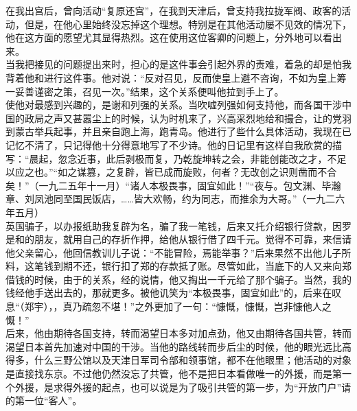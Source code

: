 在我出宫后，曾向活动“复原还宫”，在我到天津后，曾支持我拉拢军阀、政客的活动，但是，在他心里始终没忘掉这个理想。特别是在其他活动屡不见效的情况下，他在这方面的愿望尤其显得热烈。这在使用这位客卿的问题上，分外地可以看出来。\\

当我把接见的问题提出来时，担心的是这件事会引起外界的责难，着急的却是怕我背着他和进行这件事。他对说：“反对召见，反而使皇上避不咨询，不如为皇上筹一妥善谨密之策，召见一次。”结果，这个关系便叫他拉到手上了。\\

使他对最感到兴趣的，是谢和列强的关系。当吹嘘列强如何支持他，而各国干涉中国的政局之声又甚嚣尘上的时候，认为时机来了，兴高采烈地给和撮合，让的党羽到蒙古举兵起事，并且亲自跑上海，跑青岛。他进行了些什么具体活动，我现在已记忆不清了，只记得他十分得意地写了不少诗。他的日记里有这样自我欣赏的描写：“晨起，忽念近事，此后剥极而复，乃乾旋坤转之会，非能创能改之才，不足以应之也。”“如之谋篡，之复辟，皆已成而旋败，何者？无改创之识则凿而不合矣！”（一九二五年十一月）“诸人本极畏事，固宜如此！”“夜与。包文渊、毕瀚章、刘凤池同至国民饭店，……皆大欢畅，约为同志，而推余为大哥。”（一九二六年五月）\\

英国骗子，以办报纸助我复辟为名，骗了我一笔钱，后来又托介绍银行贷款，因罗是和的朋友，就用自己的存折作押，给他从银行借了四千元。觉得不可靠，来信请他父亲留心，他回信教训儿子说：“不能冒险，焉能举事？”后来果然不出他儿子所料，这笔钱到期不还，银行扣了郑的存款抵了账。尽管如此，当底下的人又来向郑借钱的时候，由于的关系，经的说情，他又掏出一千元给了那个骗子。当然，我的钱经他手送出去的，那就更多。被他讥笑为“本极畏事，固宜如此”的，后来在叹息“（郑宇），，真乃疏忽不堪！”之外更加了一句：“慷慨，慷慨，岂非慷他人之慨！”\\

后来，他由期待各国支持，转而渴望日本多对加点劲，他又由期待各国共管，转而渴望日本首先加速对中国的干涉。当他的路线转而步后尘的时候，他的眼光远比高得多，什么三野公馆以及天津日军司令部和领事馆，都不在他眼里；他活动的对象是直接找东京。不过他仍然没忘了共管，他不是把日本看做唯一的外援，而是第一个外援，是求得外援的起点，也可以说是为了吸引共管的第一步，为“开放门户”请的第一位“客人”。\\

